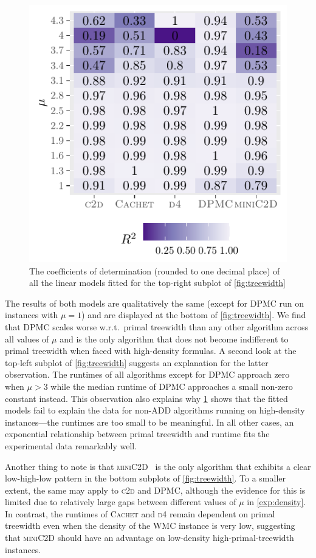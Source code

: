 \documentclass[runningheads]{llncs}
\begin{document}
\begin{figure}[t]
  \centering
  \includegraphics{r2}
  \caption{The coefficients of determination (rounded to one decimal place) of
    all the linear models fitted for the top-right subplot of
    \cref{fig:treewidth}}\label{fig:r2}
\end{figure}

The results of both models are qualitatively the same (except for \textsc{DPMC}
run on instances with $\mu = 1$) and are displayed at the bottom of
\cref{fig:treewidth}. We find that \textsc{DPMC} scales worse w.r.t.\ primal
treewidth than any other algorithm across all values of $\mu$ and is the only
algorithm that does not become indifferent to primal treewidth when faced with
high-density formulas. A second look at the top-left subplot of
\cref{fig:treewidth} suggests an explanation for the latter observation. The
runtimes of all algorithms except for \textsc{DPMC} approach zero when $\mu > 3$
while the median runtime of \textsc{DPMC} approaches a small non-zero constant
instead. This observation also explains why \cref{fig:r2} shows that the fitted
models fail to explain the data for non-ADD algorithms running on high-density
instances---the runtimes are too small to be meaningful. In all other cases, an
exponential relationship between primal treewidth and runtime fits the
experimental data remarkably well.

Another thing to note is that \textsc{miniC2D}~\cite{DBLP:conf/ijcai/OztokD15}
is the only algorithm that exhibits a clear low-high-low pattern in the bottom
subplots of \cref{fig:treewidth}. To a smaller extent, the same may apply to
\textsc{c2d} and \textsc{DPMC}, although the evidence for this is limited due to
relatively large gaps between different values of $\mu$ in \cref{exp:density}.
In contrast, the runtimes of \textsc{Cachet} and \textsc{d4} remain dependent on
primal treewidth even when the density of the \textsf{WMC} instance is very low,
suggesting that \textsc{miniC2D} should have an advantage on low-density
high-primal-treewidth instances.
\end{document}
